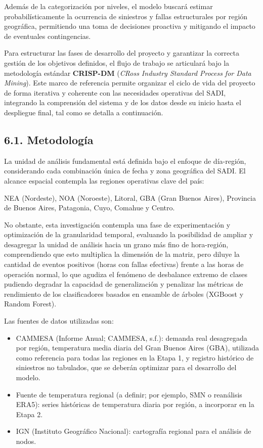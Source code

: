 Además de la categorización por niveles, el modelo buscará estimar probabilísticamente la ocurrencia de siniestros y fallas estructurales por región geográfica, permitiendo una toma de decisiones proactiva y mitigando el impacto de eventuales contingencias.

Para estructurar las fases de desarrollo del proyecto y garantizar la correcta gestión de los objetivos definidos, el flujo de trabajo se articulará bajo la metodología estándar \textbf{CRISP-DM} (\emph{CRoss Industry Standard Process for Data Mining}). Este marco de referencia permite organizar el ciclo de vida del proyecto de forma iterativa y coherente con las necesidades operativas del SADI, integrando la comprensión del sistema y de los datos desde su inicio hasta el despliegue final, tal como se detalla a continuación.

\hypertarget{metodologuxeda}{%
\subsection{6.1. Metodología}\label{metodologuxeda}}

La unidad de análisis fundamental está definida bajo el enfoque de día-región, considerando cada combinación única de fecha y zona geográfica del SADI. El alcance espacial contempla las regiones operativas clave del país:

NEA (Nordeste), NOA (Noroeste), Litoral, GBA (Gran Buenos Aires), Provincia de Buenos Aires, Patagonia, Cuyo, Comahue y Centro.

No obstante, esta investigación contempla una fase de experimentación y optimización de la granularidad temporal, evaluando la posibilidad de ampliar y desagregar la unidad de análisis hacia un grano más fino de hora-región, comprendiendo que esto multiplica la dimensión de la matriz, pero diluye la cantidad de eventos positivos (horas con fallas efectivas) frente a las horas de operación normal, lo que agudiza el fenómeno de desbalance extremo de clases pudiendo degradar la capacidad de generalización y penalizar las métricas de rendimiento de los clasificadores basados en ensamble de árboles (XGBoost y Random Forest).

Las fuentes de datos utilizadas son:

\begin{itemize}
\item
  CAMMESA (Informe Anual; CAMMESA, s.f.): demanda real desagregada por región, temperatura media diaria del Gran Buenos Aires (GBA), utilizada como referencia para todas las regiones en la Etapa 1, y registro histórico de siniestros no tabulados, que se deberán optimizar para el desarrollo del modelo.
\item
  Fuente de temperatura regional (a definir; por ejemplo, SMN o reanálisis ERA5): series históricas de temperatura diaria por región, a incorporar en la Etapa 2.
\item
  IGN (Instituto Geográfico Nacional): cartografía regional para el análisis de nodos.
\end{itemize}

